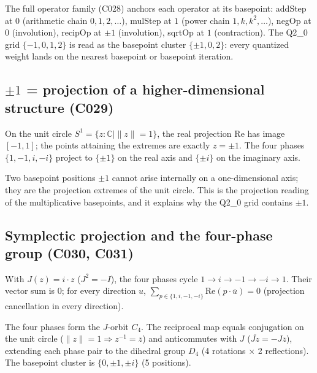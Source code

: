 \documentclass[sigplan,10pt,anonymous,review]{acmart}
\begin{document}
The full operator family (C028) anchors each operator at its basepoint:
addStep at $0$ (arithmetic chain $0,1,2,\dots$), mulStep at $1$ (power chain
$1,k,k^2,\dots$), negOp at $0$ (involution), recipOp at $\pm1$ (involution),
sqrtOp at $1$ (contraction). The Q2\_0 grid $\{-1,0,1,2\}$ is read as the
basepoint cluster $\{\pm1, 0, 2\}$: every quantized weight lands on the
nearest basepoint or basepoint iteration.

\subsection{$\pm1$ = projection of a higher-dimensional structure (C029)}

\begin{theorem}[C029]
On the unit circle $S^1 = \{z : \mathbb C \mid \|z\|=1\}$, the real projection
$\mathrm{Re}$ has image $[-1,1]$; the points attaining the extremes are exactly
$z = \pm1$. The four phases $\{1,-1,i,-i\}$ project to $\{\pm1\}$ on the real
axis and $\{\pm i\}$ on the imaginary axis.
\end{theorem}

Two basepoint positions $\pm1$ cannot arise internally on a one-dimensional
axis; they are the projection extremes of the unit circle. This is the
projection reading of the multiplicative basepoints, and it explains why the
Q2\_0 grid contains $\pm1$.

\subsection{Symplectic projection and the four-phase group (C030, C031)}

\begin{theorem}[C030]
With $J(z) = i\cdot z$ ($J^2 = -I$), the four phases cycle
$1 \to i \to -1 \to -i \to 1$. Their vector sum is $0$; for every direction $u$,
$\sum_{p \in \{1,i,-1,-i\}} \mathrm{Re}(p\cdot\overline{u}) = 0$
(projection cancellation in every direction).
\end{theorem}

\begin{theorem}[C031]
The four phases form the $J$-orbit $C_4$. The reciprocal map equals
conjugation on the unit circle ($\|z\|=1 \Rightarrow z^{-1} = \overline{z}$)
and anticommutes with $J$ ($\overline{Jz} = -J\overline{z}$), extending each
phase pair to the dihedral group $D_4$ (4 rotations $\times$ 2 reflections).
The basepoint cluster is $\{0, \pm1, \pm i\}$ (5 positions).
\end{theorem}
\end{document}
